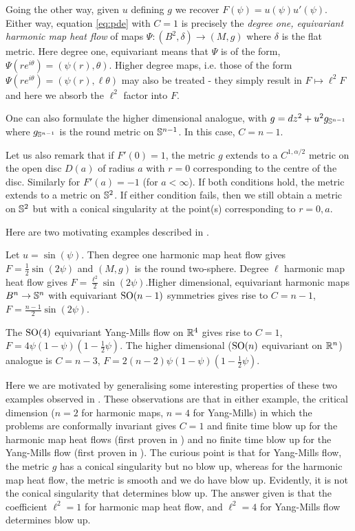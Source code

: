 \documentclass{amsart}
\begin{document}
Going the other way, given \(u\) defining \(g\) we recover \(F(\psi) = u(\psi) u'(\psi)\). Either way, equation \eqref{eq:pde}  with \(C = 1\) is precisely the \emph{degree one, equivariant harmonic map heat flow} of maps \(\Psi: (B^2, \delta) \to (M, g)\) where \(\delta\) is the flat metric. Here degree one, equivariant means that \(\Psi\) is of the form, \(\Psi(re^{i\theta}) = (\psi(r), \theta)\). Higher degree maps, i.e. those of the form \(\Psi(re^{i\theta}) = (\psi(r), \ell \theta)\) may also be treated - they simply result in \(F \mapsto \ell^2 F\) and here we absorb the \(\ell^2\) factor into \(F\).

One can also formulate the higher dimensional analogue, with \(g = dz^2 + u^2 g_{\S^{n-1}}\) where \(g_{\S^{n-1}}\) is the round metric on \(\S^{n-1}\). In this case, \(C = n-1\).

Let us also remark that if \(F'(0) = 1\), the metric \(g\) extends to a \(C^{1,\alpha/2}\) metric on the open disc \(D(a)\) of radius \(a\) with \(r = 0\) corresponding to the centre of the disc. Similarly for \(F'(a) = -1\) (for \(a < \infty\)). If both conditions hold, the metric extends to a metric on \(\S^2\). If either condition fails, then we still obtain a metric on \(\S^2\) but with a conical singularity at the point(s) corresponding to \(r=0, a\).

Here are two motivating examples described in \cite{MR2332425}.

\begin{example}
Let \(u = \sin(\psi)\). Then degree one harmonic map heat flow gives \(F = \tfrac{1}{2} \sin(2\psi)\) and \((M, g)\) is the round two-sphere. Degree \(\ell\) harmonic map heat flow gives \(F = \tfrac{\ell^2}{2} \sin(2\psi)\).Higher dimensional, equivariant harmonic maps \(B^n \to \S^n\) with equivariant \(\SO(n-1)\) symmetries gives rise to \(C = n-1\), \(F = \tfrac{n-1}{2} \sin(2\psi)\).
\end{example}

\begin{example}
The \(\SO(4)\) equivariant Yang-Mills flow on \(\R^4\) gives rise to \(C = 1\), \(F = 4 \psi(1 - \psi)(1 - \tfrac{1}{2}\psi)\). The higher dimensional (\(\SO(n)\) equivariant on \(\R^n\)) analogue is \(C = n-3\), \(F = 2(n-2) \psi(1-\psi)(1 - \tfrac{1}{2}\psi)\).
\end{example}

Here we are motivated by generalising some interesting properties of these two examples observed in \cite{MR2332425}. These observations are that in either example, the critical dimension (\(n=2\) for harmonic maps, \(n=4\) for Yang-Mills) in which the problems are conformally invariant gives \(C = 1\) and finite time blow up for the harmonic map heat flows (first proven in \cite{MR1180392}) and no finite time blow up for the Yang-Mills flow (first proven in \cite{MR1600272}). The curious point is that for Yang-Mills flow, the metric \(g\) has a conical singularity but no blow up, whereas for the harmonic map heat flow, the metric is smooth and we do have blow up. Evidently, it is not the conical singularity that determines blow up. The answer given is that the coefficient \(\ell^2 = 1\) for harmonic map heat flow, and \(\ell^2 = 4\) for Yang-Mills flow determines blow up.
\end{document}
